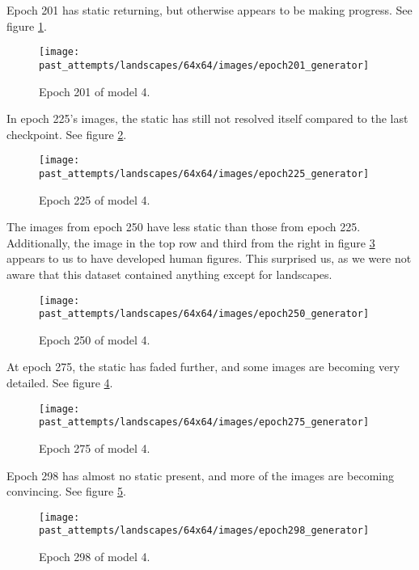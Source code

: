 \documentclass[11pt,letterpaper]{article}
\begin{document}
				Epoch 201 has static returning, but otherwise appears to be making progress.
				See figure \ref{fig:wa64:epoch201generator}.
				\begin{figure}
					\centering
					\texttt{[image: past\_attempts/landscapes/64x64/images/epoch201\_generator]}
					\caption{Epoch 201 of model 4.}
					\label{fig:wa64:epoch201generator}
				\end{figure}

				In epoch 225's images, the static has still not resolved itself compared to the last checkpoint.
				See figure \ref{fig:wa64:epoch225generator}.
				\begin{figure}
					\centering
					\texttt{[image: past\_attempts/landscapes/64x64/images/epoch225\_generator]}
					\caption{Epoch 225 of model 4.}
					\label{fig:wa64:epoch225generator}
				\end{figure}

				The images from epoch 250 have less static than those from epoch 225.
				Additionally, the image in the top row and third from the right in figure \ref{fig:wa64:epoch250generator} appears to us to have developed human figures.
				This surprised us, as we were not aware that this dataset contained anything except for landscapes.
				\begin{figure}
					\centering
					\texttt{[image: past\_attempts/landscapes/64x64/images/epoch250\_generator]}
					\caption{Epoch 250 of model 4.}
					\label{fig:wa64:epoch250generator}
				\end{figure}

				At epoch 275, the static has faded further, and some images are becoming very detailed.
				See figure \ref{fig:wa64:epoch275generator}.
				\begin{figure}
					\centering
					\texttt{[image: past\_attempts/landscapes/64x64/images/epoch275\_generator]}
					\caption{Epoch 275 of model 4.}
					\label{fig:wa64:epoch275generator}
				\end{figure}

				Epoch 298 has almost no static present, and more of the images are becoming convincing.
				See figure \ref{fig:wa64:epoch298generator}.
				\begin{figure}
					\centering
					\texttt{[image: past\_attempts/landscapes/64x64/images/epoch298\_generator]}
					\caption{Epoch 298 of model 4.}
					\label{fig:wa64:epoch298generator}
				\end{figure}
\end{document}
